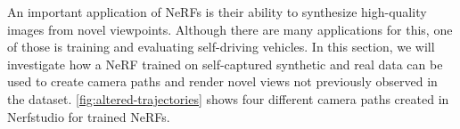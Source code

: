 An important application of NeRFs is their ability to synthesize high-quality images from novel viewpoints. Although there are many applications for this, one of those is training and evaluating self-driving vehicles. In this section, we will investigate how a NeRF trained on self-captured synthetic and real data can be used to create camera paths and render novel views not previously observed in the dataset. \autoref{fig:altered-trajectories} shows four different camera paths created in Nerfstudio for trained NeRFs.



%
%





